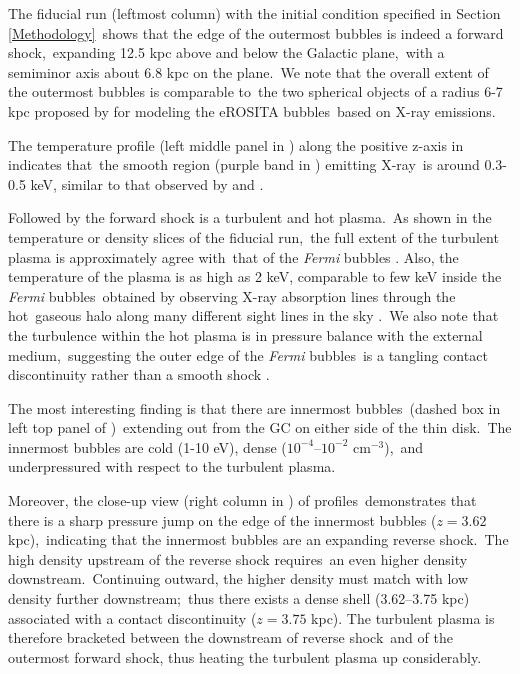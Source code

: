 \documentclass[twocolumn]{aastex631}
\begin{document}
 The fiducial run (leftmost column) with the initial condition specified in Section \ref{Methodology}\
 shows that the edge of the outermost bubbles is indeed a forward shock,\
 expanding 12.5 kpc above and below the Galactic plane,\
 with a semiminor axis about 6.8 kpc on the plane.\
 We note that the overall extent of the outermost bubbles is comparable to\
 the two spherical objects of a radius 6-7 kpc proposed by \citet{Predehl2020} for modeling the eROSITA bubbles\
 based on X-ray emissions.

 The temperature profile (left middle panel in ) along the positive z-axis in\
  indicates that\
 the smooth region (purple band in ) emitting X-ray\
 is around 0.3-0.5 keV, similar to that observed by \citet{Miller2016} and \citet{Kataoka2018}.

 Followed by the forward shock is a turbulent and hot plasma.\
 As shown in the temperature or density slices of the fiducial run,\
 the full extent of the turbulent plasma is approximately agree with\
 that of the \textit{Fermi} bubbles \citep{Su2010}.
 Also, the temperature of the plasma is as high as 2 keV, comparable to few keV inside the \textit{Fermi} bubbles\
 obtained by observing X-ray absorption lines through the hot\
 gaseous halo along many different sight lines in the sky \citep{Miller_2013}.\
 We also note that the turbulence within the hot plasma is in pressure balance with the external medium,\
 suggesting the outer edge of the \textit{Fermi} bubbles\
 is a tangling contact discontinuity rather than a smooth shock \citep{Zhang2020}.

 The most interesting finding is that there are innermost bubbles\
 (dashed box in left top panel of )\
 extending out from the GC on either side of the thin disk.\
 The innermost bubbles are cold (1-10 eV), dense ($10^{-4}$--$10^{-2}$ cm$^{-3}$),\
 and underpressured with respect to the turbulent plasma.\


 Moreover, the close-up view (right column in \Cref{fig__profile}) of profiles\
 demonstrates that there is a sharp pressure jump on the edge of the innermost bubbles ($z=3.62$ kpc),\
 indicating that the innermost bubbles are an expanding reverse shock.\
 The high density upstream of the reverse shock requires\
 an even higher density downstream.\
 Continuing outward, the higher density must match with low density further downstream;\
 thus there exists a dense shell (3.62--3.75 kpc) associated with a contact discontinuity ($z=3.75$ kpc).
 The turbulent plasma is therefore bracketed between the downstream of reverse shock\
 and of the outermost forward shock, thus heating the turbulent plasma up considerably.
\end{document}
